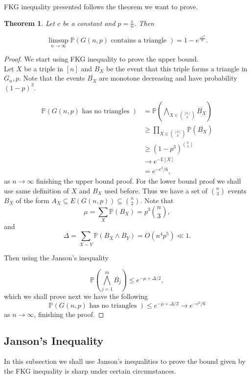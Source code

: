 \documentclass[12pt,twoside,a4paper,bibliography=totocnumbered]{book}
\numberwithin{equation}{section}
\newtheorem{theorem}             {Theorem}[section]
\theoremstyle{remark}
\begin{document}
FKG inequality presented follows the theorem we want to prove.
\begin{theorem} \label{theo:FKG}
Let $c$ be a constant and $p = \frac{c}{n}$. Then

$$ \limsup_{n \rightarrow \infty}\mathbb{P}(G(n,p)\text{ contains a triangle }) = 1 - e^{\frac{-c^3}{6}}.$$
\end{theorem}
\begin{proof}

We start using FKG inequality to prove the upper bound.\\
Let $X$ be a triple in $[n]$ and $B_X$ be the event that this triple forms a triangle in $G_n,p$. Note that the events $\overline{B_X}$ are monotone decreasing and have probability $(1-p)^3$.

\begin{align*}
\mathbb{P}(G(n,p) \text{ has no triangles }) &= \mathbb{P}\left( \bigwedge_{X \in \binom{[n]}{3}} \overline{B_X}\right) \\
& \geq \prod_{X \in \binom{[n]}{3}} \mathbb{P}(\overline{B_X})\\
& \geq (1-p^3)^{\binom{n}{3}}\\
& \rightarrow e^{-\mathbb{E}[X]}\\
& = e^{-c^3/6},
\end{align*}
as $n \rightarrow \infty$ finishing the upper bound proof. For the lower bound proof we shall use same definition of $X$ and $B_X$ used before. Thus we have a set of $\binom{n}{3}$ events $B_X$ of the form $A_X \subseteq E(G(n,p)) \subseteq \binom{n}{2}$.
Note that 
$$\mu = \sum_X \mathbb{P} (B_X) = p^3\binom {n}{3},$$
and
$$\Delta = \sum_{X\sim Y} \mathbb{P}(B_X \wedge B_Y) = O(n^4 p^5) \ll 1.$$

Then using the Janson's inequality 

$$ \mathbb{P}\left(\bigwedge_{j=1}^m \overline{B_j}\right) \leq e^{-\mu + \Delta/2}, $$
which we shall prove next we have the following 
$$ \mathbb{P}(G(n,p)\text{ has no triangles }) \leq e^{-\mu + \Delta/2} \rightarrow e^{-c^3/6}$$
as $n \rightarrow \infty$, finishing the proof.
\end{proof}

\subsection{Janson's Inequality}

In this subsection we shall use Janson's inequalities to prove the bound given by the FKG inequality is sharp under certain circumstances.
\end{document}
